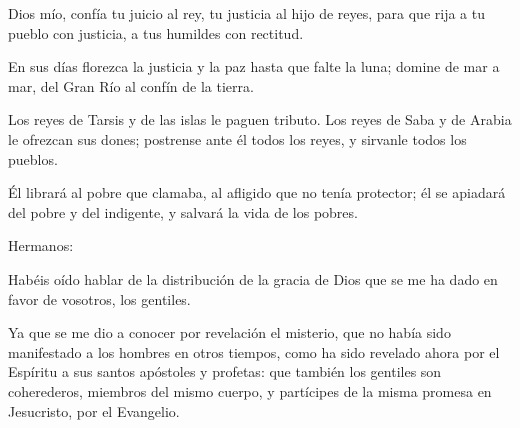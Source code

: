 		 
		
		
		\begin{psbody}
			Dios mío, confía tu juicio al rey,
			tu justicia al hijo de reyes,
			para que rija a tu pueblo con justicia,
			a tus humildes con rectitud.
			
			En sus días florezca la justicia
			y la paz hasta que falte la luna;
			domine de mar a mar,
			del Gran Río al confín de la tierra.
			
			Los reyes de Tarsis y de las islas
			le paguen tributo.
			Los reyes de Saba y de Arabia
			le ofrezcan sus dones;
			postrense ante él todos los reyes,
			y sirvanle todos los pueblos.
			
			Él librará al pobre que clamaba,
			al afligido que no tenía protector;
			él se apiadará del pobre y del indigente,
			y salvará la vida de los pobres.
		\end{psbody}

		
		 
		

		\begin{scripture}
			Hermanos:
			
			Habéis oído hablar de la distribución de la gracia de Dios que se me ha dado en favor de vosotros, los gentiles.
			
			Ya que se me dio a conocer por revelación el misterio, que no había sido manifestado a los hombres en otros tiempos, como ha sido revelado ahora por el Espíritu a sus santos apóstoles y profetas: que también los gentiles son coherederos, miembros del mismo cuerpo, y partícipes de la misma promesa en Jesucristo, por el Evangelio.
		\end{scripture}
	
		
		 
		
		
